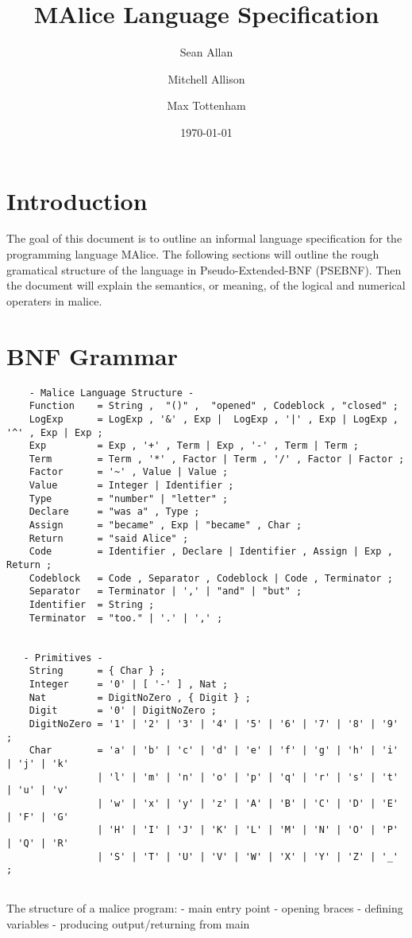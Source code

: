 \documentclass[a4wide, 11pt]{article}
\begin{document}
\title{MAlice Language Specification}

\author{Sean Allan \and Mitchell Allison \and Max Tottenham}

\date{\today}         %

\maketitle            %

\section{Introduction}

The goal of this document is to outline an informal language specification for 
the programming language MAlice. The following sections will outline the rough
gramatical structure of the language in Pseudo-Extended-BNF (PSEBNF). Then the 
document will explain the semantics, or meaning, of the logical and numerical 
operaters in malice.

\section{BNF Grammar} 

\begin{verbatim}
    - Malice Language Structure - 
    Function    = String ,  "()" ,  "opened" , Codeblock , "closed" ;
    LogExp      = LogExp , '&' , Exp |  LogExp , '|' , Exp | LogExp , '^' , Exp | Exp ;
    Exp         = Exp , '+' , Term | Exp , '-' , Term | Term ;
    Term        = Term , '*' , Factor | Term , '/' , Factor | Factor ;
    Factor      = '~' , Value | Value ;
    Value       = Integer | Identifier ;
    Type        = "number" | "letter" ;
    Declare     = "was a" , Type ;
    Assign      = "became" , Exp | "became" , Char ;
    Return      = "said Alice" ;
    Code        = Identifier , Declare | Identifier , Assign | Exp , Return ;
    Codeblock   = Code , Separator , Codeblock | Code , Terminator ; 
    Separator   = Terminator | ',' | "and" | "but" ; 
    Identifier  = String ;
    Terminator  = "too." | '.' | ',' ;
    

   - Primitives -
    String      = { Char } ;
    Integer     = '0' | [ '-' ] , Nat ;
    Nat         = DigitNoZero , { Digit } ;
    Digit       = '0' | DigitNoZero ; 
    DigitNoZero = '1' | '2' | '3' | '4' | '5' | '6' | '7' | '8' | '9' ;
    Char        = 'a' | 'b' | 'c' | 'd' | 'e' | 'f' | 'g' | 'h' | 'i' | 'j' | 'k' 
                | 'l' | 'm' | 'n' | 'o' | 'p' | 'q' | 'r' | 's' | 't' | 'u' | 'v'
                | 'w' | 'x' | 'y' | 'z' | 'A' | 'B' | 'C' | 'D' | 'E' | 'F' | 'G'
                | 'H' | 'I' | 'J' | 'K' | 'L' | 'M' | 'N' | 'O' | 'P' | 'Q' | 'R'
                | 'S' | 'T' | 'U' | 'V' | 'W' | 'X' | 'Y' | 'Z' | '_' ;
 
\end{verbatim}
The structure of a malice program:
	- main entry point
	- opening braces
	- defining variables
	- producing output/returning from main
\end{document}
